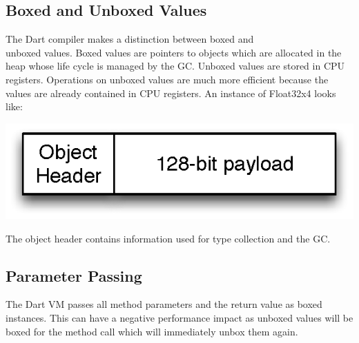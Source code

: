 \documentclass[preprint]{sigplanconf}
\begin{document}
\subsection{Boxed and Unboxed Values}

\label{boxing}
The Dart compiler makes a distinction between boxed and \\
unboxed\cite{unboxing} values. Boxed values are pointers to objects which are allocated in the heap whose life cycle is managed by the GC. Unboxed values are stored in CPU registers. Operations on unboxed values are much more efficient because the values are already contained in CPU registers. An instance of Float32x4 looks like:

\includegraphics{boxedobject.eps}

The object header contains information used for type collection and the GC.

\subsection{Parameter Passing}
The Dart VM passes all method parameters and the return value as boxed instances. This can have a negative performance impact as unboxed values will be boxed for the method call which will immediately unbox them again.
\end{document}
